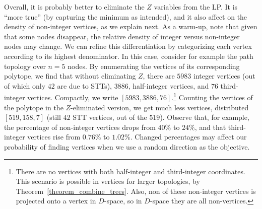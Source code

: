 Overall, it is probably better to eliminate the $Z$ variables from the LP. It is ``more true'' (by capturing the minimum as intended), and it also affect on the density of non-integer vertices, as we explain next. As a warm-up, note that given that some nodes disappear, the relative density of integer versus non-integer nodes may change. We can refine this differentiation by categorizing each vertex according to its highest denominator. In this case, consider for example the path topology over $n=5$ nodes. By enumerating the vertices of its corresponding polytope, we find that without eliminating $Z$, there are $5983$ integer vertices (out of which only $42$ are due to STTs), $3886$, half-integer vertices, and $76$ third-integer vertices. Compactly, we write $[5983,3886,76]$.\footnote{There are no vertices with both half-integer and third-integer coordinates. This scenario is possible in vertices for larger topologies, by Theorem~\ref{theorem_combine_trees}.
Also, non of these non-integer vertices is projected onto a vertex in $D$-space, so in $D$-space they are all non-vertices.} Counting the vertices of the polytope in the $Z$-eliminated version, we get much less vertices, distributed $[519,158,7]$ (still $42$ STT vertices, out of the $519$). Observe that, for example, the percentage of non-integer vertices drops from $40\%$ to $24\%$, and that third-integer vertices rise from $0.76\%$ to $1.02\%$. Changed percentages may affect our probability of finding vertices
when we use a random direction as the objective.


